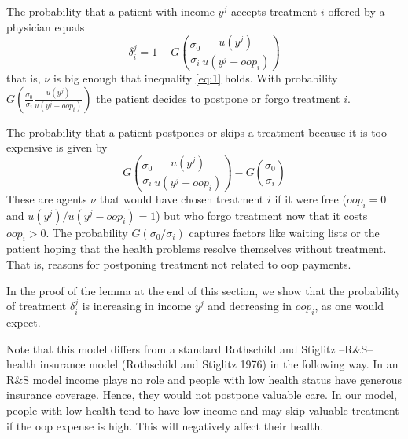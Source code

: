 \documentclass[a4paper,12pt]{article}
\makeatletter
\newcommand{\citeprocitem}[2]{\hyper@linkstart{cite}{citeproc_bib_item_#1}#2\hyper@linkend}
\makeatother
\begin{document}
The probability that a patient with income \(y^{j}\) accepts treatment \(i\) offered by a physician equals
\begin{equation}
\label{eq:2}
\delta_i^j = 1-G\left( \frac{\sigma_0}{\sigma_i} \frac{u(y^{j})}{u(y^{j}-oop_i)} \right)
\end{equation}
that is, \(\nu\) is big enough that inequality \eqref{eq:1} holds. With probability \(G\left( \frac{\sigma_0}{\sigma_i} \frac{u(y^{j})}{u(y^{j}-oop_i)} \right)\) the patient decides to postpone or forgo treatment \(i\).

The probability that a patient postpones or skips a treatment because it is too expensive is given by
\begin{equation}
\label{eq:3}
G\left( \frac{\sigma_0}{\sigma_i} \frac{u(y^{j})}{u(y^{j}-oop_{i})} \right) - G\left( \frac{\sigma_0}{\sigma_i} \right)
\end{equation}
These are agents \(\nu\) that would have chosen treatment \(i\) if it were free (\(oop_{i}=0\) and \(u(y^j)/u(y^j-oop_i)=1\)) but who forgo treatment now that it costs \(oop_{i}>0\). The probability \(G(\sigma_{0}/\sigma_{i})\) captures factors like waiting lists or the patient hoping that the health problems resolve themselves without treatment. That is, reasons for postponing treatment not related to oop payments.

In the proof of the lemma at the end of this section, we show that the probability of treatment \(\delta_i^j\) is increasing in income \(y^j\) and decreasing in \(oop_{i}\), as one would expect.

Note that this model differs from a standard Rothschild and Stiglitz --R\&S-- health insurance model (\citeprocitem{23}{Rothschild and Stiglitz 1976}) in the following way. In an R\&S model income plays no role and people with low health status have generous insurance coverage. Hence, they would not postpone valuable care. In our model, people with low health tend to have low income and may skip valuable treatment if the oop expense is high. This will negatively affect their health.
\end{document}
